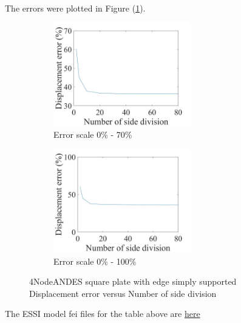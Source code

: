 \documentclass[fleqn,11pt]{article}
\begin{document}

The errors were plotted in Figure (\ref{fig 4NodeANDES square plate with four edge simply supported}).
\begin{figure}[H]
  \begin{subfigure}{0.5\textwidth}
    \centering
    \includegraphics[width=6cm]{../Figure-files/error4andes_square_plate_simply_supported.jpeg}
    \caption{Error scale 0\% - 70\%}
  \end{subfigure}
  \begin{subfigure}{0.5\textwidth}
    \centering
    \includegraphics[width=6cm]{../Figure-files/error4andes_square_plate_simply_supported100.jpeg}
    \caption{Error scale 0\% - 100\%}
  \end{subfigure}
  \captionsetup{justification=centering,margin=2cm}
  \caption{4NodeANDES square plate with edge simply supported\\
      Displacement error   versus   Number of side division}
  \label{fig 4NodeANDES square plate with four edge simply supported}
\end{figure}


The ESSI model fei files for the table above are \href{https://github.com/yuan-energy/ESSI_Verification/blob/master/4NodeANDES/square_plate_simply_support/square_plate_simply_support.tar.gz?raw=true}{here}
\end{document}
